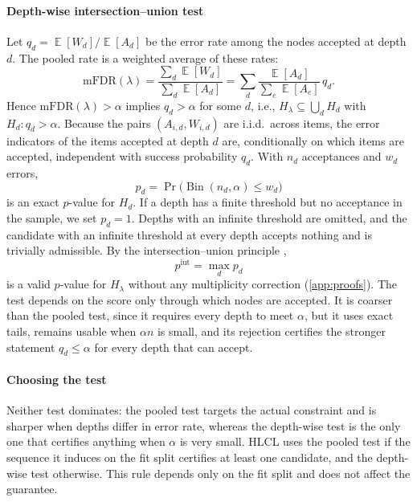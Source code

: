 \documentclass[preprint,12pt]{elsarticle}
\theoremstyle{definition}
\newcommand{\hlcl}{\textup{\textsc{HLCL}}}
\newcommand{\fdr}{\mathrm{mFDR}}
\DeclareMathOperator{\E}{\mathbb{E}}
\DeclareMathOperator{\Bin}{Bin}
\begin{document}
\paragraph{Depth-wise intersection--union test}
Let $q_d=\E[W_d]/\E[A_d]$ be the error rate among the nodes accepted at depth
$d$. The pooled rate is a weighted average of these rates:
\begin{equation}
  \fdr(\lambda)=\frac{\sum_d\E[W_d]}{\sum_d\E[A_d]}
  =\sum_d\frac{\E[A_d]}{\sum_e\E[A_e]}\,q_d .
  \label{eq:weightedavg}
\end{equation}
Hence $\fdr(\lambda)>\alpha$ implies $q_d>\alpha$ for some $d$, i.e.,
$H_\lambda\subseteq\bigcup_d H_d$ with $H_d:q_d>\alpha$. Because the pairs
$(A_{i,d},W_{i,d})$ are i.i.d.\ across items, the error indicators of the items
accepted at depth $d$ are, conditionally on which items are accepted,
independent with success probability $q_d$. With $n_d$ acceptances and $w_d$
errors,
\begin{equation}
  p_d=\Pr\bigl(\Bin(n_d,\alpha)\le w_d\bigr)
  \label{eq:binomial}
\end{equation}
is an exact $p$-value for $H_d$. If a depth has a finite threshold but no
acceptance in the sample, we set $p_d=1$. Depths with an infinite threshold are
omitted, and the candidate with an infinite threshold at every depth accepts
nothing and is trivially admissible. By the intersection--union principle \citep{berger1982multiparameter},
\begin{equation}
  p^{\mathrm{iut}}=\max_d p_d
  \label{eq:iut}
\end{equation}
is a valid $p$-value for $H_\lambda$ without any multiplicity correction
(\ref{app:proofs}). The test depends on the score only through which
nodes are accepted. It is coarser than the pooled test, since it requires every
depth to meet $\alpha$, but it uses exact tails, remains usable when $\alpha n$
is small, and its rejection certifies the stronger statement $q_d\le\alpha$ for
every depth that can accept.

\paragraph{Choosing the test}
Neither test dominates: the pooled test targets the actual constraint and is
sharper when depths differ in error rate, whereas the depth-wise test is the
only one that certifies anything when $\alpha$ is very small. \hlcl{} uses the
pooled test if the sequence it induces on the fit split certifies at least one
candidate, and the depth-wise test otherwise. This rule depends only on the fit
split and does not affect the guarantee.
\end{document}
